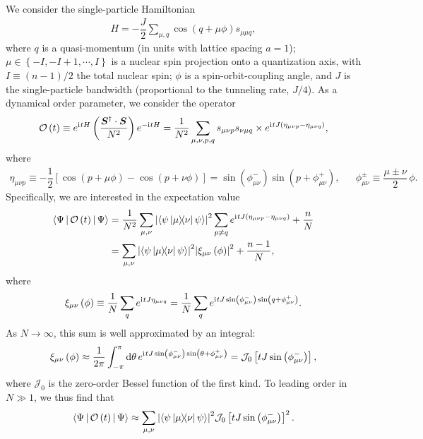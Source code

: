 \documentclass[nofootinbib,notitlepage,11pt]{revtex4-2}
\newcommand{\f}[2]{\dfrac{#1}{#2}} %
\newcommand{\p}[1]{\left(#1\right)} %
\renewcommand{\sp}[1]{\left[#1\right]} %
\renewcommand{\set}[1]{\left\{#1\right\}} %
\newcommand{\bk}{\Braket} %
\renewcommand{\v}{\bm} %
\renewcommand{\c}{\cdot} %
\renewcommand{\dd}{\text{d}} %
\renewcommand{\i}{\mathrm{i}\mkern1mu} %
\newcommand{\1}{\mathds{1}}
\newcommand{\J}{\mathcal{J}}
\renewcommand{\O}{\mathcal{O}}
\begin{document}
We consider the single-particle Hamiltonian
\begin{align}
  H = -\f{J}{2} \sum_{\mu,q} \cos\p{q + \mu\phi} s_{\mu\mu q},
\end{align}
where $q$ is a quasi-momentum (in units with lattice spacing $a=1$);
$\mu\in\set{-I,-I+1,\cdots,I}$ is a nuclear spin projection onto a
quantization axis, with $I\equiv\p{n-1}/2$ the total nuclear spin;
$\phi$ is a spin-orbit-coupling angle, and $J$ is the single-particle
bandwidth (proportional to the tunneling rate, $J/4$).  As a dynamical
order parameter, we consider the operator
\begin{align}
  \O\p{t}
  \equiv e^{\i t H} \p{\f{\v S^\dag \c\v S}{N^2}} e^{-\i t H}
  = \f1{N^2} \sum_{\mu,\nu,p,q} s_{\mu\nu p} s_{\nu\mu q} \times
  e^{\i tJ\p{\eta_{\mu\nu p}-\eta_{\mu\nu q}}},
\end{align}
where
\begin{align}
  \eta_{\mu\nu p}
  \equiv -\f12 \sp{\cos\p{p+\mu\phi} - \cos\p{p+\nu\phi}}
  = \sin\p{\phi_{\mu\nu}^-} \sin\p{p+\phi_{\mu\nu}^+},
  &&
  \phi_{\mu\nu}^\pm \equiv \f{\mu\pm\nu}{2}\,\phi.
\end{align}
Specifically, we are interested in the expectation value
\begin{align}
  \bk{\Psi|\O\p{t}|\Psi}
  &= \f1{N^2} \sum_{\mu,\nu} \abs{\bk{\psi\op{\mu}{\nu}\psi}}^2
  \sum_{p\ne q} e^{\i tJ\p{\eta_{\mu\nu p}-\eta_{\mu\nu q}}} + \f{n}{N} \\
  &= \sum_{\mu,\nu} \abs{\bk{\psi\op{\mu}{\nu}\psi}}^2
  \abs{\xi_{\mu\nu}\p{\phi}}^2 + \f{n-1}{N},
\end{align}
where
\begin{align}
  \xi_{\mu\nu}\p{\phi} \equiv \f1N \sum_q e^{\i tJ\eta_{\mu\nu q}}
  = \f1N \sum_q e^{\i tJ\sin\p{\phi_{\mu\nu}^-} \sin\p{q+\phi_{\mu\nu}^+}}.
\end{align}
As $N\to\infty$, this sum is well approximated by an integral:
\begin{align}
  \xi_{\mu\nu}\p{\phi} \approx \f1{2\pi} \int_{-\pi}^\pi \dd\theta\,
  e^{\i tJ\sin\p{\phi_{\mu\nu}^-} \sin\p{\theta+\phi_{\mu\nu}^+}}
  = \J_0\sp{tJ\sin\p{\phi_{\mu\nu}^-}},
\end{align}
where $\J_0$ is the zero-order Bessel function of the first kind.  To
leading order in $N\gg1$, we thus find that
\begin{align}
  \bk{\Psi|\O\p{t}|\Psi}
  \approx \sum_{\mu,\nu} \abs{\bk{\psi\op{\mu}{\nu}\psi}}^2
  \J_0\sp{tJ\sin\p{\phi_{\mu\nu}^-}}^2.
  \label{eq:O_time}
\end{align}
\end{document}
